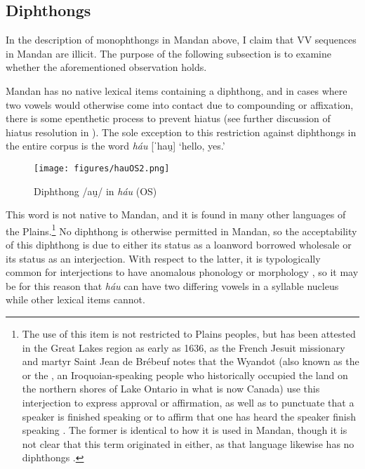\subsection{Diphthongs}\label{subsectiondiphthongs}

In the description of monophthongs in Mandan above, I claim that VV sequences in Mandan are illicit. The purpose of the following subsection is to examine whether the aforementioned observation holds.

Mandan has no native lexical items containing a diphthong, and in cases where two vowels would otherwise come into contact due to compounding or affixation, there is some epenthetic process to prevent hiatus (see further discussion of hiatus resolution in ). The sole exception to this restriction against diphthongs in the entire corpus is the word \textit{háu} [ˈhau̯] `hello, yes.'


\begin{figure}
\caption{Diphthong /au̯/ in \textit{háu} (OS)}\label{OSdiphthong}
\texttt{[image: figures/hauOS2.png]}

\end{figure}

\newpage
This word is not native to Mandan, and it is found in many other languages of the Plains.\footnote{The use of this item is not restricted to Plains peoples, but has been attested in the Great Lakes region as early as 1636, as the French Jesuit missionary and martyr Saint Jean de Brébeuf notes that the Wyandot (also known as the  or the , an Iroquoian-speaking people who historically occupied the land on the northern shores of Lake Ontario in what is now Canada) use this interjection to express approval or affirmation, as well as to punctuate that a speaker is finished speaking or to affirm that one has heard the speaker finish speaking \citep[146]{axtell1981}. The former is identical to how it is used in Mandan, though it is not clear that this term originated in  either, as that language likewise has no diphthongs \citep[325]{julian2010}.} No diphthong is otherwise permitted in Mandan, so the acceptability of this diphthong is due to either its status as a loanword borrowed wholesale or its status as an interjection. With respect to the latter, it is typologically common for interjections to have anomalous phonology or morphology \citep[105]{ameka1992}, so it may be for this reason that \textit{háu} can have two differing vowels in a syllable nucleus while other lexical items cannot.

